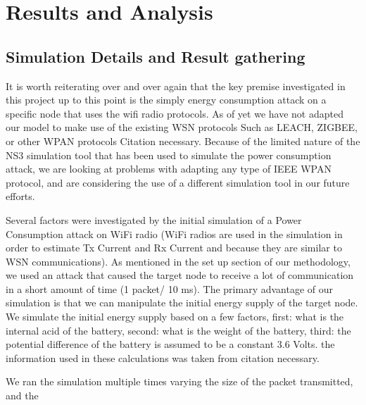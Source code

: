 \section{Results and Analysis}

\subsection{Simulation Details and Result gathering}
It is worth reiterating over and over again that the key premise investigated in this project up to this point is the simply energy consumption attack on a specific node that uses the wifi radio protocols. As of yet we have not adapted our model to make use of the existing WSN protocols
Such as LEACH, ZIGBEE, or other WPAN protocols {Citation necessary}. Because of the limited nature of the NS3 simulation tool that has been used to simulate the power consumption attack, we are looking at problems with adapting any type of IEEE WPAN protocol, and are considering the use of a different simulation tool in our future efforts. 


Several factors were investigated by the initial simulation of a Power Consumption attack on WiFi radio (WiFi radios are used in the simulation in order to estimate Tx Current and Rx Current and because they are similar to WSN communications). As mentioned in the set up section of our methodology, we used an attack that caused the target node to receive a lot of communication in a short amount of time (1 packet/ 10 ms). The primary advantage of our simulation is that we can manipulate the initial energy supply of the target node. We simulate the initial energy supply based on a few factors, first: what is the internal acid of the battery, second: what is the weight of the battery, third: the potential difference of the battery is assumed to be a constant 3.6 Volts. the information used in these calculations was taken from {citation necessary}.

We ran the simulation multiple times varying the size of the packet transmitted, and the 